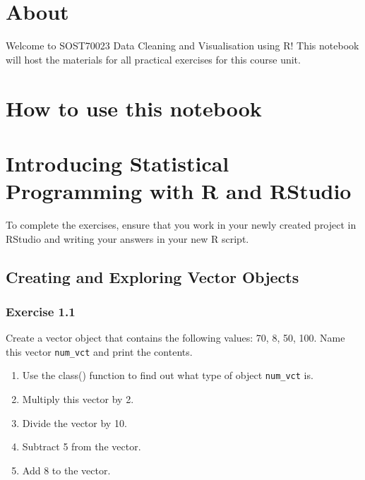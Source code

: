 \documentclass[
]{book}
\author{}
\date{\vspace{-2.5em}2024-01-26}
\providecommand{\tightlist}{%
  \setlength{\itemsep}{0pt}\setlength{\parskip}{0pt}}
\begin{document}
{
\setcounter{tocdepth}{1}
\tableofcontents
}
\hypertarget{about}{%
\chapter*{About}\label{about}}

Welcome to SOST70023 Data Cleaning and Visualisation using R! This notebook will host the materials for all practical exercises for this course unit.

\hypertarget{how-to-use-this-notebook}{%
\chapter*{How to use this notebook}\label{how-to-use-this-notebook}}

\hypertarget{introducing-statistical-programming-with-r-and-rstudio}{%
\chapter{Introducing Statistical Programming with R and RStudio}\label{introducing-statistical-programming-with-r-and-rstudio}}

To complete the exercises, ensure that you work in your newly created project in RStudio and writing your answers in your new R script.

\hypertarget{creating-and-exploring-vector-objects}{%
\section{Creating and Exploring Vector Objects}\label{creating-and-exploring-vector-objects}}

\hypertarget{exercise-1.1}{%
\subsection{Exercise 1.1}\label{exercise-1.1}}

Create a vector object that contains the following values: 70, 8, 50, 100. Name this vector \texttt{num\_vct} and print the contents.

\begin{enumerate}
\def\labelenumi{\alph{enumi}.}
\tightlist
\item
  Use the class() function to find out what type of object \texttt{num\_vct} is.
\item
  Multiply this vector by 2.
\item
  Divide the vector by 10.
\item
  Subtract 5 from the vector.
\item
  Add 8 to the vector.
\end{enumerate}
\end{document}
